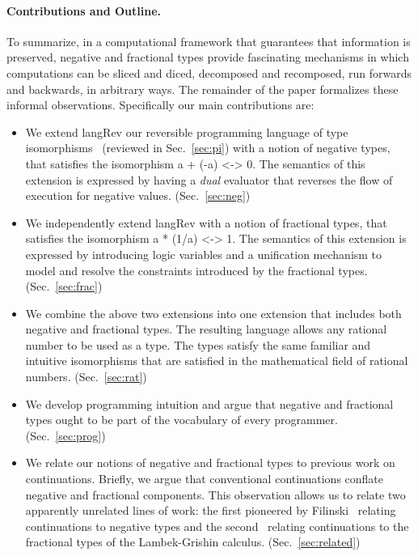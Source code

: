 \documentclass[preprint]{sigplanconf}
\begin{document}

\paragraph*{Contributions and Outline.} 
To summarize, in a computational framework that guarantees that information
is preserved, negative and fractional types provide fascinating mechanisms in
which computations can be sliced and diced, decomposed and recomposed, run
forwards and backwards, in arbitrary ways. The remainder of the paper
formalizes these informal observations. Specifically our main contributions
are:
\begin{itemize}
\item We extend {{langRev}} our reversible programming language of type
  isomorphisms~\cite{rc2011,infeffects} (reviewed in Sec.~\ref{sec:pi}) with a notion
  of negative types, that satisfies the isomorphism {{a + (-a) <-> 0}}. The
  semantics of this extension is expressed by having a \emph{dual} evaluator
  that reverses the flow of execution for negative
  values. (Sec.~\ref{sec:neg})
\item We independently extend {{langRev}} with a notion of fractional types,
  that satisfies the isomorphism {{a * (1/a) <-> 1}}. The semantics of this
  extension is expressed by introducing logic variables and a unification
  mechanism to model and resolve the constraints introduced by the fractional
  types. (Sec.~\ref{sec:frac})
\item We combine the above two extensions into one extension that includes
  both negative and fractional types. The resulting language allows any
  rational number to be used as a type. The types satisfy the same familiar
  and intuitive isomorphisms that are satisfied in the mathematical field of
  rational numbers. (Sec.~\ref{sec:rat})
\item We develop programming intuition and argue that negative and fractional
  types ought to be part of the vocabulary of every
  programmer. (Sec.~\ref{sec:prog})
\item We relate our notions of negative and fractional types to previous work
  on continuations. Briefly, we argue that conventional continuations
  conflate negative and fractional components. This observation allows us to
  relate two apparently unrelated lines of work: the first pioneered by
  Filinski~\cite{Filinski:1989:DCI:648332.755574} relating continuations to
  negative types and the second~\cite{Bernardi:2010:CSL:1749618.1749689}
  relating continuations to the fractional types of the Lambek-Grishin
  calculus. (Sec.~\ref{sec:related})
\end{itemize}
\end{document}
